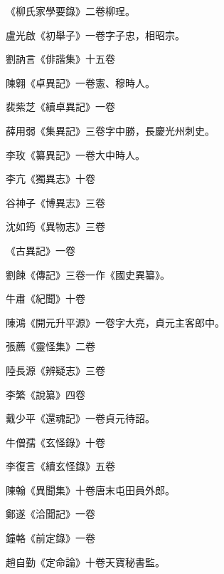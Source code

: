\begin{pinyinscope}
 《柳氏家學要錄》二卷柳珵。



 盧光啟《初舉子》一卷字子忠，相昭宗。



 劉訥言《俳諧集》十五卷



 陳翱《卓異記》一卷憲、穆時人。



 裴紫芝《續卓異記》一卷



 薛用弱《集異記》三卷字中勝，長慶光州刺史。



 李玫《纂異記》一卷大中時人。



 李亢《獨異志》十卷



 谷神子《博異志》三卷



 沈如筠《異物志》三卷



 《古異記》一卷



 劉餗《傳記》三卷一作《國史異纂》。



 牛肅《紀聞》十卷



 陳鴻《開元升平源》一卷字大亮，貞元主客郎中。



 張薦《靈怪集》二卷



 陸長源《辨疑志》三卷



 李繁《說纂》四卷



 戴少平《還魂記》一卷貞元待詔。



 牛僧孺《玄怪錄》十卷



 李復言《續玄怪錄》五卷



 陳翰《異聞集》十卷唐末屯田員外郎。



 鄭遂《洽聞記》一卷



 鐘輅《前定錄》一卷



 趙自勤《定命論》十卷天寶秘書監。




\end{pinyinscope}

